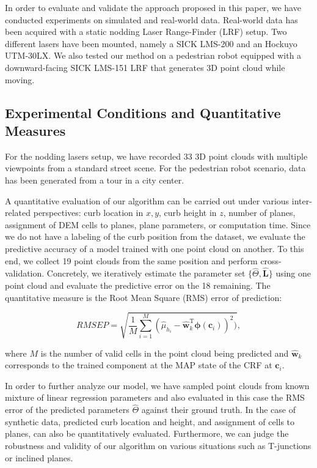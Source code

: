In order to evaluate and validate the approach proposed in this paper, we have
conducted experiments on simulated and real-world data. Real-world data
has been acquired with a static nodding Laser Range-Finder (LRF) setup. Two
different lasers have been mounted, namely a SICK LMS-200 and an Hockuyo
UTM-30LX. We also tested our method on a pedestrian robot equipped with a
downward-facing SICK LMS-151 LRF that generates 3D point cloud while moving.

\subsection{Experimental Conditions and Quantitative Measures}

For the nodding lasers setup, we have recorded 33 3D point clouds with multiple
viewpoints from a standard street scene. For the pedestrian robot scenario, data
has been generated from a tour in a city center.

A quantitative evaluation of our algorithm can be carried out under various
inter-related perspectives: curb location in $x,y$, curb height in $z$,
number of planes, assignment of DEM cells to planes, plane parameters, or
computation time. Since we do not have a labeling of the curb position from
the dataset, we evaluate the predictive accuracy of a model trained
with one point cloud on another. To this end, we collect 19 point clouds from
the same position and perform cross-validation. Concretely, we iteratively
estimate the parameter set $\{\hat{\Theta},\mathbf{\hat{L}}\}$ using one point
cloud and evaluate the predictive error on the 18 remaining. The quantitative
measure is the Root Mean Square (RMS) error of prediction:

\begin{equation}
\label{eqn:rmspred}
RMSEP=\sqrt{\frac{1}{M}\sum_{i=1}^M(\hat{\mu}_{h_i}-\mathbf{\hat{w}}_k^\text{T}
\boldsymbol{\phi}(\mathbf{c}_i))^ 2)},
\end{equation}

where $M$ is the number of valid cells in the point cloud being predicted and
$\mathbf{\hat{w}}_k$ corresponds to the trained component at the MAP state of
the CRF at $\mathbf{c}_i$.

In order to further analyze our model, we have sampled point clouds from known
mixture of linear regression parameters and also evaluated in this case the RMS
error of the predicted parameters $\hat{\Theta}$ against their ground truth. In
the case of synthetic data, predicted curb location and height, and assignment
of cells to planes, can also be quantitatively evaluated. Furthermore, we can
judge the robustness and validity of our algorithm on various situations such
as T-junctions or inclined planes.

